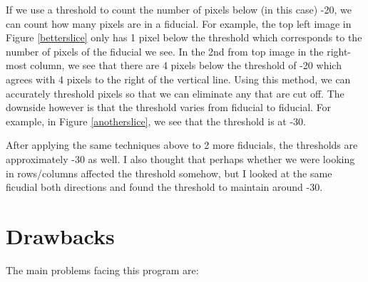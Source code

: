 \documentclass[10pt]{scrartcl}
\begin{document}
If we use a threshold to count the number of pixels below (in this case) -20, we can count how many pixels are in a fiducial. For example, the top left image in Figure \ref{betterslice} only has 1 pixel below the threshold which corresponds to the number of pixels of the fiducial we see. In the 2nd from top image in the right-most column, we see that there are 4 pixels below the threshold of -20 which agrees with 4 pixels to the right of the vertical line. Using this method, we can accurately threshold pixels so that we can eliminate any that are cut off. The downside however is that the threshold varies from fiducial to fiducial. For example, in Figure \ref{anotherslice}, we see that the threshold is at -30.


After applying the same techniques above to 2 more fiducials, the thresholds are approximately -30 as well. I also thought that perhaps whether we were looking in rows/columns affected the threshold somehow, but I looked at the same ficudial both directions and found the threshold to maintain around -30. 

\section{Drawbacks}

    The main problems facing this program are:
\end{document}
